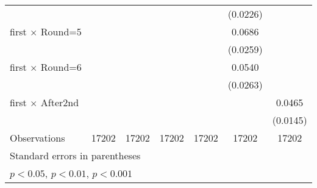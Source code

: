 {\begin{tabular}{l*{6}{c}}
                    &                     &                     &                     &                     &    (0.0226)         &                     \\
[1em]
first $\times$ Round=5&                     &                     &                     &                     &      0.0686\sym{**} &                     \\
                    &                     &                     &                     &                     &    (0.0259)         &                     \\
[1em]
first $\times$ Round=6&                     &                     &                     &                     &      0.0540\sym{*}  &                     \\
                    &                     &                     &                     &                     &    (0.0263)         &                     \\
[1em]
first $\times$ After2nd&                     &                     &                     &                     &                     &      0.0465\sym{**} \\
                    &                     &                     &                     &                     &                     &    (0.0145)         \\
\hline
Observations        &       17202         &       17202         &       17202         &       17202         &       17202         &       17202         \\
\hline\hline
\multicolumn{7}{l}{\footnotesize Standard errors in parentheses}\\
\multicolumn{7}{l}{\footnotesize \sym{*} \(p<0.05\), \sym{**} \(p<0.01\), \sym{***} \(p<0.001\)}\\
\end{tabular}
}
